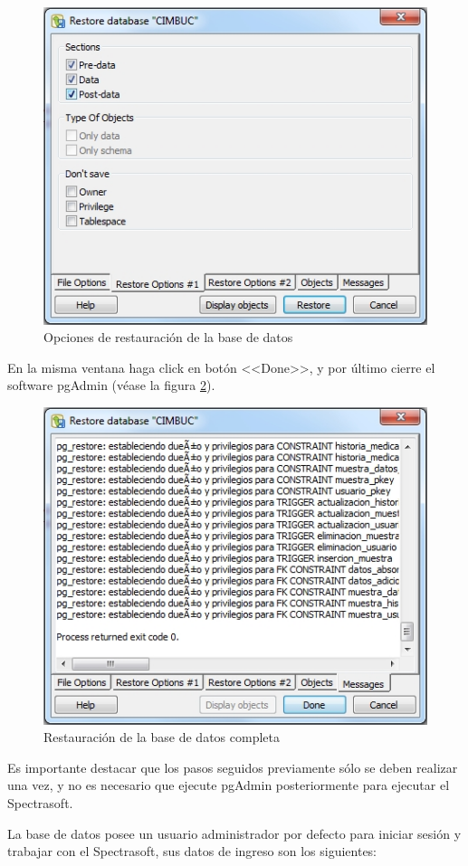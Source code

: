 \begin{figure}[H]
  \centering
  \includegraphics[width=.6\linewidth]{./img/pgadmin-restaurar-opciones.jpg}
\caption[]{Opciones de restauraci\'{o}n de la base de datos\label{fig:pgadmin-restaurar-opciones}}
\end{figure}

\newpage

En la misma ventana haga click en bot\'{o}n <<Done>>, y por \'{u}ltimo cierre el software pgAdmin (v\'{e}ase la figura \ref{fig:pgadmin-restaurar-listo}).

\begin{figure}[H]
  \centering
  \includegraphics[width=.6\linewidth]{./img/pgadmin-restaurar-listo.jpg}
\caption[]{Restauraci\'{o}n de la base de datos completa\label{fig:pgadmin-restaurar-listo}}
\end{figure}

Es importante destacar que los pasos seguidos previamente s\'{o}lo se deben realizar una vez, y no es necesario que ejecute pgAdmin posteriormente para ejecutar el Spectrasoft.

La base de datos posee un usuario administrador por defecto para iniciar sesi\'{o}n y trabajar con el Spectrasoft, sus datos de ingreso son los siguientes: 


